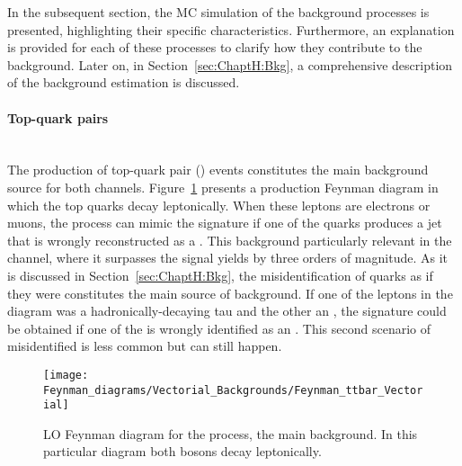  


In the subsequent section, the MC simulation of the background processes 
is presented, highlighting their specific characteristics. Furthermore, an 
explanation is provided for each of these processes to clarify how they contribute
to the background. Later on, in Section~\ref{sec:ChaptH:Bkg}, a 
comprehensive description of the background estimation is discussed. %


\paragraph{Top-quark pairs}\mbox{}\\
The production of top-quark pair (\ttbar) events constitutes the main background source
for both \dileptau channels. Figure~\ref{fig:tHq:Backgrounds:Feynman_ttbar} presents
a \ttbar production Feynman diagram in which the top quarks decay leptonically. 
When these leptons are electrons or muons, the \ttbar process can mimic the
\dileptau signature if one of the quarks produces a jet that is wrongly reconstructed 
as a \tauhad. This background particularly relevant in the \dilepOStau channel, where
it surpasses the signal yields by three orders of magnitude.
As it is discussed in Section~\ref{sec:ChaptH:Bkg}, the misidentification of quarks as if they were \tauhad constitutes the main source of background.
If one of the leptons in the \ttbar diagram was a hadronically-decaying tau and the other an \emu, the 
\dileptau signature could be obtained if one of the \bjets is wrongly identified as an \emu. This second scenario
of misidentified \emu is less common but can still happen.

\begin{figure}[h]
\centering
\texttt{[image: Feynman\_diagrams/Vectorial\_Backgrounds/Feynman\_ttbar\_Vectorial]}
\caption{LO Feynman diagram for the \ttbar process, the main background. 
	In this particular diagram both \PW bosons decay leptonically.}
\label{fig:tHq:Backgrounds:Feynman_ttbar}
\end{figure}

